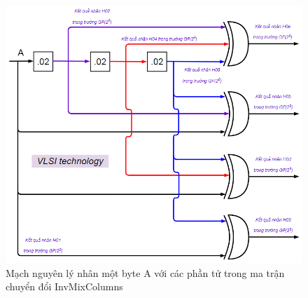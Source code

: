 \begin{itemize}
\begin{figure}[H]
    \centering
    \includegraphics[scale=0.5]{pic/huê/Mạch nguyên lý nhân một byte A với các phần tử trong ma trận chuyển đổi InvMixColumns.png}
    
    \caption{Mạch nguyên lý nhân một byte A với các phần tử trong ma trận chuyển đổi InvMixColumns}
\end{figure}
\end{itemize}

